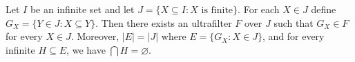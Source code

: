 Let $I$ be an infinite set and let $J = \{X \subseteq I : X \text{ is finite}\}$. For each $X \in J$ define $G_X = \{Y \in J : X \subseteq Y\}$. Then there exists an ultrafilter $F$ over $J$ such that $G_X \in F$ for every $X \in J$. Moreover, $|E| = |J|$ where $E = \{G_X : X \in J\}$, and for every infinite $H \subseteq E$, we have $\bigcap H = \varnothing$.
